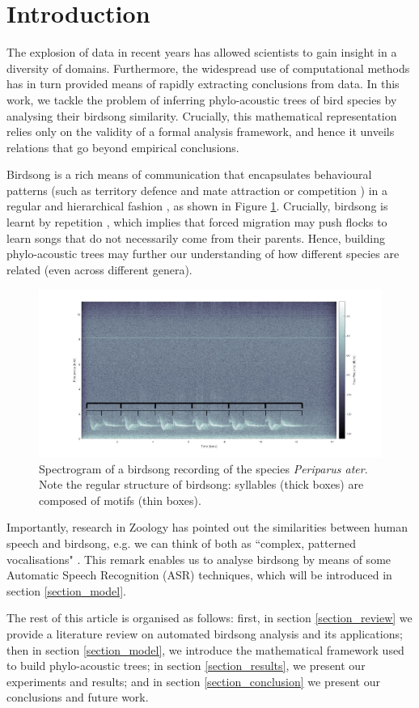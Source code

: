 \documentclass[pdftex,11pt,a4paper]{article}
\theoremstyle{definition}
\theoremstyle{remark}
\begin{document}
\section{Introduction}
\label{section_introduction}
The explosion of data in recent years has allowed scientists to gain insight in a diversity of domains. Furthermore, the widespread use of computational methods has in turn provided means of rapidly extracting conclusions from data. In this work, we tackle the problem of inferring phylo-acoustic trees of bird species by analysing their birdsong similarity. Crucially, this mathematical representation relies only on the validity of a formal analysis framework, and hence it unveils relations that go beyond empirical conclusions. 
\par Birdsong is a rich means of communication that encapsulates behavioural patterns (such as territory defence and mate attraction or competition \cite{Berwick2013, Naguib2014}) in a regular and hierarchical fashion \cite{Snowdon2013}, as shown in Figure \ref{fig_birdsong_structure}. Crucially, birdsong is learnt by repetition \cite{Berwick2013}, which implies that forced migration may push flocks to learn songs that do not necessarily come from their parents. Hence, building phylo-acoustic trees may further our understanding of how different species are related (even across different genera).
\begin{figure}[t]
\centering
\includegraphics[width=\textwidth]{images/birdsong_structure}
\caption{Spectrogram of a birdsong recording of the species \emph{Periparus ater}. Note the regular structure of birdsong: syllables (thick boxes) are composed of motifs (thin boxes).}
\label{fig_birdsong_structure}
\end{figure}
\par Importantly, research in Zoology has pointed out the similarities between human speech and birdsong, e.g. we can think of both as ``complex, patterned vocalisations" \cite{Berwick2013,Naguib2014}. This remark enables us to analyse birdsong by means of some Automatic Speech Recognition (ASR) techniques, which will be introduced in section \ref{section_model}. 
\par The rest of this article is organised as follows: first, in section \ref{section_review} we provide a literature review on automated birdsong analysis and its applications; then in section \ref{section_model}, we introduce the mathematical framework used to build phylo-acoustic trees; in section \ref{section_results}, we present our experiments and results; and in section \ref{section_conclusion} we present our conclusions and future work.
\end{document}
